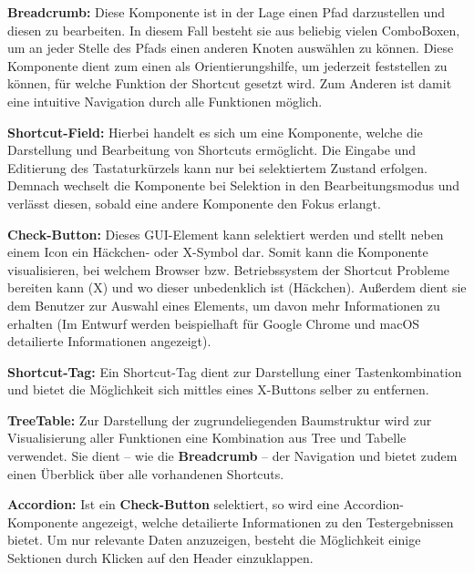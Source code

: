  \textbf{Breadcrumb:} Diese Komponente ist in der Lage einen Pfad darzustellen und diesen zu bearbeiten. In diesem Fall besteht sie aus beliebig vielen ComboBoxen, um an jeder Stelle des Pfads einen anderen Knoten auswählen zu können. Diese Komponente dient zum einen als Orientierungshilfe, um jederzeit feststellen zu können, für welche Funktion der Shortcut gesetzt wird. Zum Anderen ist damit eine intuitive Navigation durch alle Funktionen möglich.

 \textbf{Shortcut-Field:} Hierbei handelt es sich um eine Komponente, welche die Darstellung und Bearbeitung von Shortcuts ermöglicht. Die Eingabe und Editierung des Tastaturkürzels kann nur bei selektiertem Zustand erfolgen. Demnach wechselt die Komponente bei Selektion in den Bearbeitungsmodus und verlässt diesen, sobald eine andere Komponente den Fokus erlangt.

 \textbf{Check-Button:} Dieses GUI-Element kann selektiert werden und stellt neben einem Icon ein Häckchen- oder X-Symbol dar. Somit kann die Komponente visualisieren, bei welchem Browser bzw. Betriebssystem der Shortcut Probleme bereiten kann (X) und wo dieser unbedenklich ist (Häckchen). Außerdem dient sie dem Benutzer zur Auswahl eines Elements, um davon mehr Informationen zu erhalten (Im Entwurf werden beispielhaft für Google Chrome und macOS detailierte Informationen angezeigt).

 \textbf{Shortcut-Tag:} Ein Shortcut-Tag dient zur Darstellung einer Tastenkombination und bietet die Möglichkeit sich mittles eines X-Buttons selber zu entfernen.

 \textbf{TreeTable:} Zur Darstellung der zugrundeliegenden Baumstruktur wird zur Visualisierung aller Funktionen eine Kombination aus Tree und Tabelle verwendet. Sie dient -- wie die \textbf{Breadcrumb} -- der Navigation und bietet zudem einen Überblick über alle vorhandenen Shortcuts.

 \textbf{Accordion:} Ist ein \textbf{Check-Button} selektiert, so wird eine Accordion-Komponente angezeigt, welche detailierte Informationen zu den Testergebnissen bietet. Um nur relevante Daten anzuzeigen, besteht die Möglichkeit einige Sektionen durch Klicken auf den Header einzuklappen.

